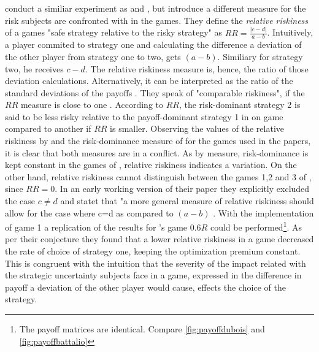 \documentclass[12pt]{article}
\begin{document}
\textcite{dubois_optimization_2012} conduct a similiar experiment as 
\textcite{schmidt_playing_2003} and \textcite{battalio_optimization_2001},
but introduce a different measure for the risk subjects are confronted with in
the games. They define the \textit{relative riskiness} of a games 
"safe strategy relative to the risky strategy" as $RR = \frac{|c-d|}{a-b}$.
Intuitively, a player commited to strategy one and calculating the 
difference a deviation of the other player from strategy one to two, gets
$(a-b)$. Similiary for strategy two, he receives $c-d$. The relative riskiness
measure is, hence, the ratio of those deviation calculations. Alternatively,
it can be interpreted as the ratio of the standard deviations of the payoffs 
\parencite{dubois_optimization_2012}. They speak of "comparable riskiness",
if the $RR$ measure is close to one \cite{dubois_optimization_2012}. 
According to $RR$, the risk-dominant strategy 2 is said to be less risky 
relative to the payoff-dominant strategy 1 in on game compared to another if 
$RR$ is smaller.
Observing the values of the relative riskiness by 
\textcite{dubois_optimization_2012} and the risk-dominance measure of 
\textcite{schmidt_playing_2003} for the games used in the papers, it is clear
that both measures are in a conflict. As by \textcite{schmidt_playing_2003}
measure, risk-dominance is kept constant in the games of 
\textcite{battalio_optimization_2001}, relative riskiness indicates a 
variation. On the other hand, relative riskiness cannot distinguish between
the games 1,2 and 3 of \textcite{schmidt_playing_2003}, since $RR=0$. In an
early working version of their paper they explicitly excluded the case 
$c \neq d$ and statet that "a more general measure of relative riskiness 
should allow for the case where c=d as compared to $(a-b)$ 
\parencite{dubois_optimization_2008_working}. 
With the implementation of game 1 a replication of the results for 
\textcite{battalio_optimization_2001}'s game $0.6R$ could be 
performed\footnote{The payoff matrices are identical. 
Compare \ref{fig:payoffdubois} and \ref{fig:payoffbattalio}}. 
As per their conjecture they found that a lower relative riskiness in a game 
decreased the rate of choice of strategy one, keeping the optimization premium 
constant. This is congruent with the intuition that the severity of the impact 
related with the strategic uncertainty subjects face in a game, expressed in
the difference in payoff a deviation of the other player would cause,
effects the choice of the strategy. 
\end{document}
